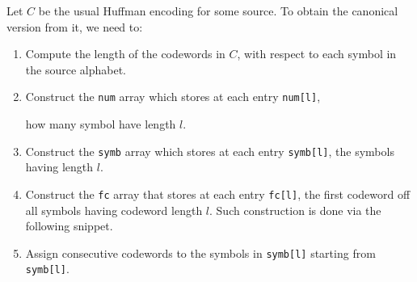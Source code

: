 \documentclass{subfiles}
\begin{document}
    Let \(C\) be the usual Huffman encoding for some source.
        To obtain the canonical version from it, we need to: 
        \begin{enumerate}
            \item Compute the length of the codewords in \(C\),
                with respect to each symbol in the source alphabet.

            \item Construct the \lstinline{num} array which stores
                at each entry \lstinline{num[l]},

                how many symbol have length \(l\).
            \item Construct the \lstinline{symb} array which stores
                at each entry \lstinline{symb[l]},
                the symbols having length \(l\).

            \item Construct the \lstinline{fc} array that stores
                at each entry \lstinline{fc[l]},
                the first codeword off all symbols having codeword length \(l\).
                Such construction is done via the following snippet.
                

            \item Assign consecutive codewords to the symbols in \lstinline{symb[l]}
                starting from \lstinline{symb[l]}.
        \end{enumerate}
\end{document}
